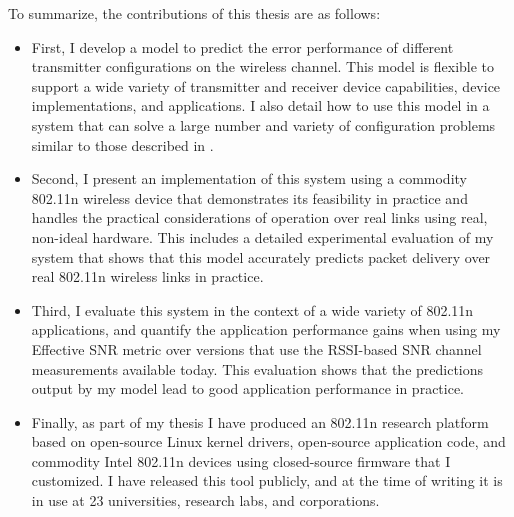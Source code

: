 To summarize, the contributions of this thesis are as follows:
\begin{itemize}[leftmargin=0.5cm,parsep=1ex,itemsep=1ex,topsep=1ex]
\item First, I develop a model to predict the error performance of different transmitter configurations on the wireless channel. This model is flexible to support a wide variety of transmitter and receiver device capabilities, device implementations, and applications. I also detail how to use this model in a system that can solve a large number and variety of configuration problems similar to those described in .
\item Second, I present an implementation of this system using a commodity 802.11n wireless device that demonstrates its feasibility in practice and handles the practical considerations of operation over real links using real, non-ideal hardware. This includes a detailed experimental evaluation of my system that shows that this model accurately predicts packet delivery over real 802.11n wireless links in practice.
\item Third, I evaluate this system in the context of a wide variety of 802.11n applications, and quantify the application performance gains when using my Effective SNR metric over versions that use the RSSI-based SNR channel measurements available today. This evaluation shows that the predictions output by my model lead to good application performance in practice.
\item Finally, as part of my thesis I have produced an 802.11n research platform based on open-source Linux kernel drivers, open-source application code, and commodity Intel 802.11n devices using closed-source firmware that I customized.
I have released this tool publicly, and at the time of writing it is in use at 23 universities, research labs, and corporations.
\end{itemize}

